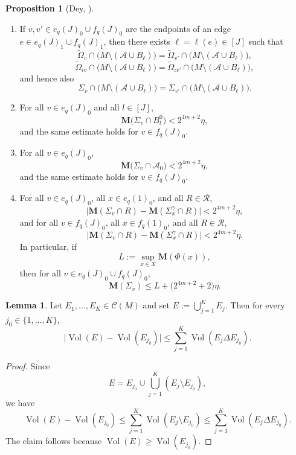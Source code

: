 \documentclass[12pt,english]{article}
\theoremstyle{definition}
\newtheorem{lemma}[theorem]{Lemma}
\newtheorem{proposition}[theorem]{Proposition}
\begin{document}
\begin{proposition}[Dey, {\cite[Proposition~3.6]{Dey}}]
\begin{enumerate}
\item[\rm(P5)$_{m,q}$]
If $v,v'\in e_q(J)_0\cup f_q(J)_0$ are the endpoints of an edge
$e\in e_q(J)_1\cup f_q(J)_1$, then there exists $\ell=\ell(e)\in[J]$ such that
\[
\widetilde\Omega_v\cap\bigl(M\setminus(\mathcal A\cup B_\ell)\bigr)
=
\widetilde\Omega_{v'}\cap\bigl(M\setminus(\mathcal A\cup B_\ell)\bigr),
\]
\[
\widetilde\Omega_{\iota v}\cap\bigl(M\setminus(\mathcal A\cup B_\ell)\bigr)
=
\widetilde\Omega_{\iota v'}\cap\bigl(M\setminus(\mathcal A\cup B_\ell)\bigr),
\]
and hence also
\[
\Sigma_v\cap\bigl(M\setminus(\mathcal A\cup B_\ell)\bigr)
=
\Sigma_{v'}\cap\bigl(M\setminus(\mathcal A\cup B_\ell)\bigr).
\]

\item[\rm(P6)$_{m,q}$]
For all $v\in e_q(J)_0$ and all $l\in[J]$,
\[
\mathbf M\bigl(\Sigma_v\cap B_l^0\bigr)<2^{4m+2}\eta,
\]
and the same estimate holds for $v\in f_q(J)_0$.

\item[\rm(P7)$_{m,q}$]
For all $v\in e_q(J)_0$,
\[
\mathbf M\bigl(\Sigma_v\cap \mathcal A_0\bigr)<2^{4m+2}\eta,
\]
and the same estimate holds for $v\in f_q(J)_0$.

\item[\rm(P8)$_{m,q}$]
For all $v\in e_q(J)_0$, all $x\in e_q(1)_0$, and all $R\in\mathcal R$,
\[
\bigl|\mathbf M(\Sigma_v\cap R)-\mathbf M(\Sigma_x^\gamma\cap R)\bigr|<2^{4m+2}\eta,
\]
and for all $v\in f_q(J)_0$, all $x\in f_q(1)_0$, and all $R\in\mathcal R$,
\[
\bigl|\mathbf M(\Sigma_v\cap R)-\mathbf M(\Sigma_x^\gamma\cap R)\bigr|<2^{4m+2}\eta.
\]
In particular, if
\[
L:=\sup_{x\in X}\mathbf M(\Phi(x)),
\]
then for all $v\in e_q(J)_0\cup f_q(J)_0$,
\[
\mathbf M(\Sigma_v)\le L+\bigl(2^{4m+2}+2\bigr)\eta.
\]
\end{enumerate}
\end{proposition}

\begin{lemma}\label{lem:union_volume_control}
Let $E_1,\dots,E_K\in \mathcal C(M)$ and set $E:=\bigcup_{j=1}^K E_j$.
Then for every $j_0\in\{1,\dots,K\}$,
\[
\bigl|\operatorname{Vol}(E)-\operatorname{Vol}(E_{j_0})\bigr|
\le \sum_{j=1}^K \operatorname{Vol}(E_j\Delta E_{j_0}).
\]
\end{lemma}

\begin{proof}
Since
\[
E=E_{j_0}\cup \bigcup_{j=1}^K(E_j\setminus E_{j_0}),
\]
we have
\[
\operatorname{Vol}(E)-\operatorname{Vol}(E_{j_0})
\le \sum_{j=1}^K \operatorname{Vol}(E_j\setminus E_{j_0})
\le \sum_{j=1}^K \operatorname{Vol}(E_j\Delta E_{j_0}).
\]
The claim follows because $\operatorname{Vol}(E)\ge \operatorname{Vol}(E_{j_0})$.
\end{proof}
\end{document}
